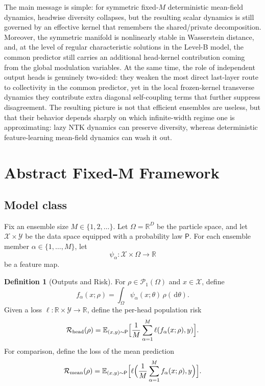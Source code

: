 \documentclass[11pt]{article}
\theoremstyle{definition}
\newtheorem{definition}[theorem]{Definition}
\newcommand{\R}{\mathbb{R}}
\newcommand{\E}{\mathbb{E}}
\newcommand{\PP}{\mathcal{P}}
\newcommand{\riskhead}{\mathcal{R}_{\mathrm{head}}}
\newcommand{\riskmean}{\mathcal{R}_{\mathrm{mean}}}
\newcommand{\dd}{\,\mathrm{d}}
\begin{document}
The main message is simple:
for symmetric fixed-$M$ deterministic mean-field dynamics,
headwise diversity collapses,
but the resulting scalar dynamics is still governed by an effective kernel that remembers the shared/private decomposition.
Moreover, the symmetric manifold is nonlinearly stable in Wasserstein distance,
and, at the level of regular characteristic solutions in the Level-B model, the common predictor still carries an additional head-kernel contribution coming from the global modulation variables.
At the same time, the role of independent output heads is genuinely two-sided:
they weaken the most direct last-layer route to collectivity in the common predictor,
yet in the local frozen-kernel transverse dynamics they contribute extra diagonal self-coupling terms that further suppress disagreement.
The resulting picture is not that efficient ensembles are useless,
but that their behavior depends sharply on which infinite-width regime one is approximating:
lazy NTK dynamics can preserve diversity, whereas deterministic feature-learning mean-field dynamics can wash it out.

\section{Abstract Fixed-M Framework}
\label{sec:abstract-fixed-m}

\subsection{Model class}

Fix an ensemble size $M \in \{1,2,\dots\}$.
Let $\Omega=\R^D$ be the particle space, and let $\mathcal{X}\times\mathcal{Y}$ be the data space equipped with a probability law $\mathsf{P}$.
For each ensemble member $\alpha \in \{1,\dots,M\}$, let
\[
  \psi_\alpha:\mathcal{X}\times\Omega \to \R
\]
be a feature map.

\begin{definition}[Outputs and Risk]
For $\rho \in \PP_1(\Omega)$ and $x \in \mathcal{X}$, define
\[
  f_\alpha(x;\rho)=\int_\Omega \psi_\alpha(x;\theta)\,\rho(\dd \theta).
\]
Given a loss $\ell:\R\times\mathcal{Y}\to\R$, define the per-head population risk
\[
  \riskhead(\rho)
  =
  \E_{(x,y)\sim \mathsf{P}}
  \Bigl[
    \frac1M \sum_{\alpha=1}^M \ell(f_\alpha(x;\rho),y)
  \Bigr].
\]
For comparison, define the loss of the mean prediction
\[
  \riskmean(\rho)
  =
  \E_{(x,y)\sim \mathsf{P}}
  \Bigl[
    \ell\Bigl(\frac1M \sum_{\alpha=1}^M f_\alpha(x;\rho),y\Bigr)
  \Bigr].
\]
\end{definition}
\end{document}
